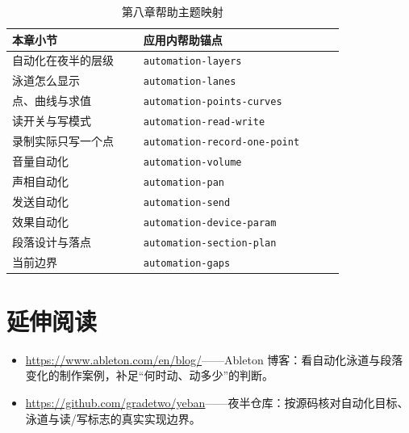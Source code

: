 \begin{table}[htbp]
\centering
\small
\begin{tabular}{@{}p{0.34\linewidth}p{0.52\linewidth}@{}}
\hline
本章小节 & 应用内帮助锚点 \\
\hline
自动化在夜半的层级 & \texttt{automation-layers} \\
泳道怎么显示 & \texttt{automation-lanes} \\
点、曲线与求值 & \texttt{automation-points-curves} \\
读开关与写模式 & \texttt{automation-read-write} \\
录制实际只写一个点 & \texttt{automation-record-one-point} \\
音量自动化 & \texttt{automation-volume} \\
声相自动化 & \texttt{automation-pan} \\
发送自动化 & \texttt{automation-send} \\
效果自动化 & \texttt{automation-device-param} \\
段落设计与落点 & \texttt{automation-section-plan} \\
当前边界 & \texttt{automation-gaps} \\
\hline
\end{tabular}
\caption{第八章帮助主题映射}
\label{tab:automation-help-map}
\end{table}

\section*{延伸阅读}
\begin{itemize}[leftmargin=1.5em]
\item \url{https://www.ableton.com/en/blog/}——Ableton 博客：看自动化泳道与段落变化的制作案例，补足“何时动、动多少”的判断。
\item \url{https://github.com/gradetwo/yeban}——夜半仓库：按源码核对自动化目标、泳道与读/写标志的真实实现边界。
\end{itemize}
